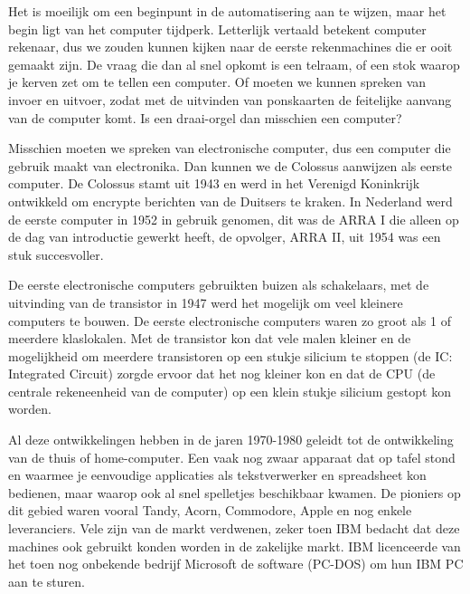 Het is moeilijk om een beginpunt in de automatisering aan te wijzen, maar het begin ligt van het computer tijdperk. Letterlijk vertaald betekent computer rekenaar, dus we zouden kunnen kijken naar de eerste rekenmachines die er ooit gemaakt zijn. De vraag die dan al snel opkomt is een telraam, of een stok waarop je kerven zet om te tellen een computer. Of moeten we kunnen spreken van invoer en uitvoer, zodat met de uitvinden van ponskaarten de feitelijke aanvang van de computer komt. Is een draai-orgel dan misschien een computer?

Misschien moeten we spreken van electronische computer, dus een computer die gebruik maakt van electronika. Dan kunnen we de Colossus aanwijzen als eerste computer. De Colossus stamt uit 1943 en werd in het Verenigd Koninkrijk ontwikkeld om encrypte berichten van de Duitsers te kraken. In Nederland werd de eerste computer in 1952 in gebruik genomen, dit was de ARRA I die alleen op de dag van introductie gewerkt heeft, de opvolger, ARRA II, uit 1954 was een stuk succesvoller.

De eerste electronische computers gebruikten buizen als schakelaars, met de uitvinding van de transistor in 1947 werd het mogelijk om veel kleinere computers te bouwen. De eerste electronische computers waren zo groot als 1 of meerdere klaslokalen. Met de transistor kon dat vele malen kleiner en de mogelijkheid om meerdere transistoren op een stukje silicium te stoppen (de IC: Integrated Circuit) zorgde ervoor dat het nog kleiner kon en dat de CPU (de centrale rekeneenheid van de computer) op een klein stukje silicium gestopt kon worden.

Al deze ontwikkelingen hebben in de jaren 1970-1980 geleidt tot de ontwikkeling van de thuis of home-computer. Een vaak nog zwaar apparaat dat op tafel stond en waarmee je eenvoudige applicaties als tekstverwerker en spreadsheet kon bedienen, maar waarop ook al snel spelletjes beschikbaar kwamen. De pioniers op dit gebied waren vooral Tandy, Acorn, Commodore, Apple en nog enkele leveranciers. Vele zijn van de markt verdwenen, zeker toen IBM bedacht dat deze machines ook gebruikt konden worden in de zakelijke markt. IBM licenceerde van het toen nog onbekende bedrijf Microsoft de software (PC-DOS) om hun IBM PC aan te sturen.
